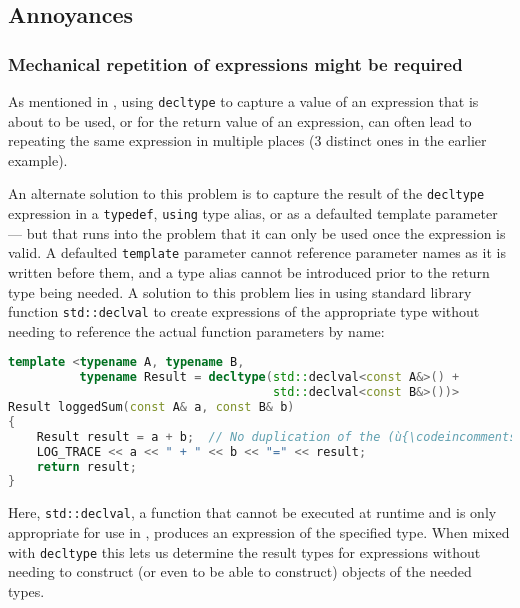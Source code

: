 \subsection[Annoyances]{Annoyances}\label{annoyances-decltype}

\subsubsection{Mechanical repetition of expressions might be required}\label{decltype-mechanical}

As mentioned in 
,
using \lstinline!decltype! to capture a value of an expression that is about to be used, or for the return value of an expression, can often lead to repeating the same expression in multiple places (3 distinct ones in the earlier example).  

An alternate solution to this problem is to capture the result of the \lstinline!decltype! expression in a \lstinline!typedef!, \lstinline!using! type alias, or as a defaulted template parameter --- but that runs into the problem that it can only be used once the expression is valid.  A defaulted \lstinline!template! parameter cannot reference parameter names as it is written before them, and a type alias cannot be introduced prior to the return type being needed.  A solution to this problem lies in using standard library function \lstinline!std::declval! to create expressions of the appropriate type without needing to reference the actual function parameters by name:

\begin{lstlisting}[language=C++]
template <typename A, typename B,
          typename Result = decltype(std::declval<const A&>() + 
                                     std::declval<const B&>())>
Result loggedSum(const A& a, const B& b)
{
    Result result = a + b;  // No duplication of the (ù{\codeincomments{decltype}}ù) expression
    LOG_TRACE << a << " + " << b << "=" << result;
    return result;
}
\end{lstlisting}

Here, \lstinline!std::declval!, a function that cannot be executed at runtime and is only appropriate for use in , produces an expression of the specified type.  When mixed with \lstinline!decltype! this lets us determine the result types for expressions without needing to construct (or even to be able to construct) objects of the needed types.

